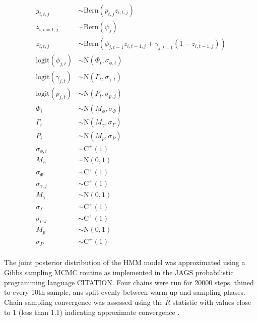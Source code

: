 \documentclass[12pt,letterpaper]{article}
\begin{document}
\begin{equation}
  \begin{aligned}
    y_{i, t, j} &\sim \mathrm{Bern}(p_{t, j} z_{i, t, j}) \\
    z_{i, t = 1, j} &\sim \mathrm{Bern}(\psi_{j}) \\
    z_{i, t, j} &\sim \mathrm{Bern}(\phi_{j, t - 1} z_{i, t - 1, j} + \gamma_{j, t - 1} (1 - z_{i, t - 1, j})) \\
    \mathrm{logit}(\phi_{j, t}) &\sim \mathrm{N}(\Phi_{t}, \sigma_{\phi, t}) \\
    \mathrm{logit}(\gamma_{j, t}) &\sim \mathrm{N}(\Gamma_{t}, \sigma_{\gamma, t}) \\
    \mathrm{logit}(p_{j, t}) &\sim \mathrm{N}(P_{t}, \sigma_{p, j}) \\
    \Phi_{i} &\sim \mathrm{N}(M_{\phi}, \sigma_{\Phi}) \\
    \Gamma_{i} &\sim \mathrm{N}(M_{\gamma}, \sigma_{\Gamma}) \\
    P_{i} &\sim \mathrm{N}(M_{p}, \sigma_{P}) \\
    \sigma_{\phi, i} &\sim \mathrm{C}^{+}(1) \\
    M_{\phi} &\sim \mathrm{N}(0, 1) \\
    \sigma_{\Phi} &\sim \mathrm{C}^{+}(1) \\
    \sigma_{\gamma, j} &\sim \mathrm{C}^{+}(1) \\
    M_{\gamma} &\sim \mathrm{N}(0, 1) \\
    \sigma_{\Gamma} &\sim \mathrm{C}^{+}(1) \\
    \sigma_{p, j} &\sim \mathrm{C}^{+}(1) \\
    M_{p} &\sim \mathrm{N}(0, 1) \\
    \sigma_{P} &\sim \mathrm{C}^{+}(1) \\
  \end{aligned}
\end{equation}

The joint posterior distribution of the HMM model was approximated using a Gibbs sampling MCMC routine as implemented in the JAGS probabilistic programming language CITATION. Four chains were run for 20000 steps, thined to every 10th sample, ans split evenly between warm-up and sampling phases. Chain sampling convergence was assessed using the \(\hat{R}\) statistic with values close to 1 (less than 1.1) indicating approximate convergence \citep{Gelman2013d}.

\end{document}

